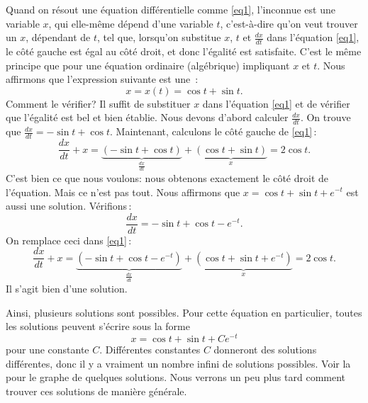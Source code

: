 Quand on résout une \'equation diff\'erentielle comme \eqref{eq1}, l'inconnue est une variable $x$, qui elle-même d\'epend d'une variable $t$, c'est-\`a-dire qu'on veut trouver un $x$, dépendant de $t$, tel que, lorsqu'on substitue $x$, $t$ et $\frac{dx}{dt}$ dans l'équation \eqref{eq1}, le c\^ot\'e gauche est \'egal au c\^ot\'e droit, et donc l'\'egalit\'e est satisfaite.  C'est le m\^eme principe que pour une \'equation ordinaire (alg\'ebrique) impliquant $x$ et $t$.  Nous affirmons que l'expression suivante est une \emph{}\,: 
\begin{equation*}
x = x(t) = \cos t + \sin t .
\end{equation*}
%
Comment le v\'erifier?  Il suffit de substituer $x$ dans l'\'equation \eqref{eq1} et de vérifier que l'égalité est bel et bien établie.    Nous devons d'abord calculer $\frac{dx}{dt}$.  On trouve que $\frac{dx}{dt} = 
-\sin t + \cos t$.  Maintenant, calculons le c\^ot\'e gauche de \eqref{eq1}\,: 
\begin{equation*}
\frac{dx}{dt} + x = 
\underbrace{(-\sin t + \cos t)}_{\frac{dx}{dt}}
+
\underbrace{(\cos t + \sin t)}_{x}
=
2\cos t .
\end{equation*}
C'est bien ce que nous voulons: nous obtenons exactement le c\^ot\'e droit de l'\'equation.
Mais ce n'est pas tout. 
Nous affirmons que 
$x = \cos t + \sin t + e^{-t}$ est aussi une solution.  Vérifions\,: 
\begin{equation*}
\frac{dx}{dt} = -\sin t + \cos t - e^{-t} .
\end{equation*}
On remplace ceci dans \eqref{eq1}\,: 
\begin{equation*}
\frac{dx}{dt} + x = 
\underbrace{(-\sin t + \cos t - e^{-t})}_{\frac{dx}{dt}} +
\underbrace{(\cos t + \sin t + e^{-t})}_{x}
= 2\cos t .
\end{equation*}
Il s'agit bien d'une solution.

Ainsi, plusieurs solutions sont possibles.  Pour cette \'equation en particulier, toutes les solutions peuvent s'\'ecrire sous la forme 
\begin{equation*}
x = \cos t + \sin t + C e^{-t} 
\end{equation*}
pour une constante $C$.  Diff\'erentes constantes $C$ donneront des solutions diff\'erentes, donc il y a vraiment un nombre infini de solutions possibles.  Voir la~ pour le graphe de quelques solutions.  Nous verrons un peu plus tard comment trouver ces solutions de mani\`ere g\'en\'erale.

\medskip

